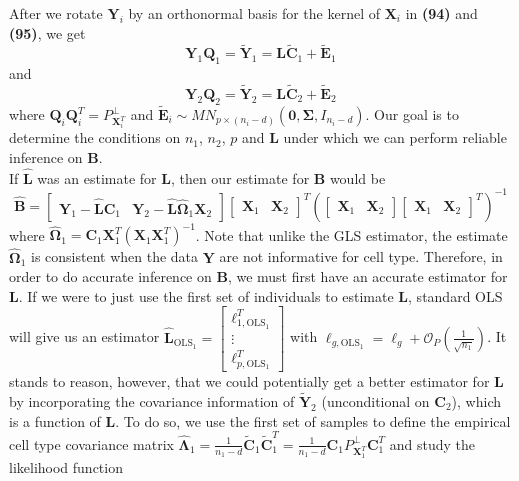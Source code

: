 \documentclass{article}
\begin{document}
After we rotate $\bm{Y}_i$ by an orthonormal basis for the kernel of $\bm{X}_i$ in \textbf{(94)} and \textbf{(95)}, we get
\begin{equation}
\bm{Y}_1\bm{Q}_1 =  \tilde{\bm{Y}}_1 = \bm{L}\tilde{\bm{C}}_1 + \tilde{\bm{E}}_1
\end{equation}
and
\begin{equation}
\bm{Y}_2\bm{Q}_2 = \tilde{\bm{Y}}_2 = \bm{L}\tilde{\bm{C}}_2 + \tilde{\bm{E}}_2
\end{equation}
where $\bm{Q}_i \bm{Q}_i^T = P_{\bm{X}_i^T}^{\perp}$ and $\tilde{\bm{E}}_i \sim MN_{p \times \left( n_i - d \right)} \left( \bm{0}, \bm{\Sigma}, I_{n_i - d} \right)$. Our goal is to determine the conditions on $n_1$, $n_2$, $p$ and $\bm{L}$ under which we can perform reliable inference on $\bm{B}$.\\
\indent If $\hat{\bm{L}}$ was an estimate for $\bm{L}$, then our estimate for $\bm{B}$ would be
\begin{equation}
\hat{\bm{B}} = \left[ \begin{matrix}
\bm{Y}_1 - \hat{\bm{L}}\bm{C}_1 & \bm{Y}_2 - \hat{\bm{L}}\hat{\bm{\Omega}}_1\bm{X}_2
\end{matrix} \right]\left[ \begin{matrix}
\bm{X}_1 & \bm{X}_2
\end{matrix} \right]^T \left( \left[ \begin{matrix}
\bm{X}_1 & \bm{X}_2
\end{matrix} \right] \left[ \begin{matrix}
\bm{X}_1 & \bm{X}_2
\end{matrix} \right]^T \right)^{-1}
\end{equation}
where $\hat{\bm{\Omega}}_1 = \bm{C}_1\bm{X}_1^T \left( \bm{X}_1\bm{X}_1^T \right)^{-1}$. Note that unlike the GLS estimator, the estimate $\hat{\bm{\Omega}}_1$ is consistent when the data $\bm{Y}$ are not informative for cell type. Therefore, in order to do accurate inference on $\bm{B}$, we must first have an accurate estimator for $\bm{L}$. If we were to just use the first set of individuals to estimate $\bm{L}$, standard OLS will give us an estimator $\hat{\bm{L}}_{\text{OLS}_1} = \left[ \begin{matrix}
\bm{\ell}_{1,{\text{OLS}_1}}^T \\
\vdots\\
\bm{\ell}_{p,{\text{OLS}_1}}^T
\end{matrix} \right]$ with $\bm{\ell}_{g,{\text{OLS}_1}} = \bm{\ell}_g + \mathcal{O}_P\left( \frac{1}{\sqrt{n_1}} \right)$. It stands to reason, however, that we could potentially get a better estimator for $\bm{L}$ by incorporating the covariance information of $\tilde{\bm{Y}}_2$ (unconditional on $\bm{C}_2$), which is a function of $\bm{L}$. To do so, we use the first set of samples to define the empirical cell type covariance matrix $\hat{\bm{\Lambda}}_1 = \frac{1}{n_1-d} \tilde{\bm{C}}_1 \tilde{\bm{C}}_1^T = \frac{1}{n_1-d} \bm{C}_1 P_{\bm{X}_1^T}^{\perp}\bm{C}_1^T$ and study the likelihood function
\end{document}
